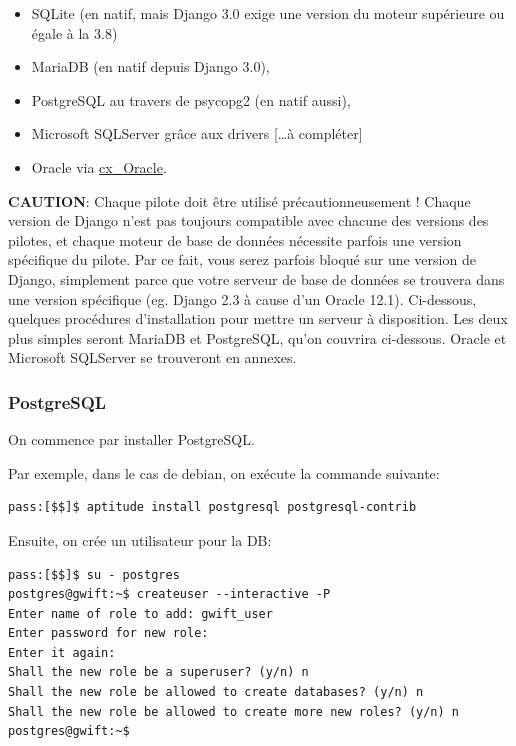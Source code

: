 \documentclass[11pt]{amsbook}
\newcommand{\admonition}[2]{\textbf{#1}: {#2}}
\begin{document}
\begin{itemize}

\item SQLite (en natif, mais Django 3.0 exige une version du moteur supérieure ou égale à la 3.8)

\item MariaDB (en natif depuis Django 3.0),

\item PostgreSQL au travers de psycopg2 (en natif aussi),

\item Microsoft SQLServer grâce aux drivers […​à compléter]

\item Oracle via \href{https://oracle.github.io/python-cx_Oracle/}{cx\_Oracle}.

\end{itemize}


\admonition{CAUTION}{Chaque pilote doit être utilisé précautionneusement ! Chaque version de Django n’est pas toujours compatible avec chacune des versions des pilotes, et chaque moteur de base de données nécessite parfois une version spécifique du pilote. Par ce fait, vous serez parfois bloqué sur une version de Django, simplement parce que votre serveur de base de données se trouvera dans une version spécifique (eg. Django 2.3 à cause d’un Oracle 12.1).}
Ci-dessous, quelques procédures d’installation pour mettre un serveur à disposition. Les deux plus simples seront MariaDB et PostgreSQL, qu’on couvrira ci-dessous. Oracle et Microsoft SQLServer se trouveront en annexes.


\hypertarget{x-postgresql}{\subsubsection{PostgreSQL}}
On commence par installer PostgreSQL.


Par exemple, dans le cas de debian, on exécute la commande suivante:


\begin{verbatim}
pass:[$$]$ aptitude install postgresql postgresql-contrib
\end{verbatim}

Ensuite, on crée un utilisateur pour la DB:


\begin{verbatim}
pass:[$$]$ su - postgres
postgres@gwift:~$ createuser --interactive -P
Enter name of role to add: gwift_user
Enter password for new role:
Enter it again:
Shall the new role be a superuser? (y/n) n
Shall the new role be allowed to create databases? (y/n) n
Shall the new role be allowed to create more new roles? (y/n) n
postgres@gwift:~$
\end{verbatim}
\end{document}
